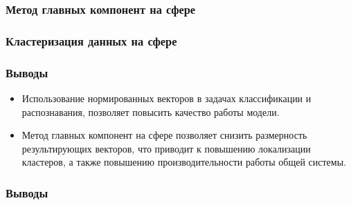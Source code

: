 \documentclass{beamer}
\begin{document}
\begin{frame}
\frametitle{Метод главных компонент на сфере}

\end{frame}

\begin{frame}
\frametitle{Кластеризация данных на сфере}

\end{frame}

\begin{frame}
\frametitle{Выводы}
\begin{itemize}
\item Использование нормированных векторов в задачах классификации и распознавания, позволяет повысить качество работы модели.
\item Метод главных компонент на сфере позволяет снизить размерность результирующих векторов, что приводит к повышению локализации кластеров, а также повышению производительности работы общей системы.
\end{itemize}

\end{frame}

\begin{frame}
\frametitle{Выводы}

\end{frame}
\end{document}
